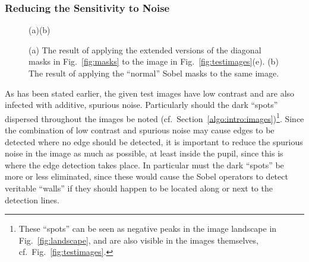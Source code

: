 \subsubsection{Reducing the Sensitivity to Noise}

\begin{figure}[tb]
  \hspace*{0.28\textwidth}(a)\hspace*{0.38\textwidth}(b)
  \caption{\label{fig:mysobel}(a) The result of
  applying the extended versions of the diagonal masks in
  Fig.~\protect\ref{fig:masks} to the image in
  Fig.~\protect\ref{fig:testimages}(e). (b) The result of applying the
  ``normal'' Sobel masks to the same image.}
\end{figure}


As has been stated earlier, the given test images have low contrast
and are also infected with additive, spurious noise.  Particularly
should the dark ``spots'' dispersed throughout the images be noted
(cf.\ Section~\ref{algo:intro:images})\footnote{These ``spots'' can be
  seen as negative peaks in the image landscape in
  Fig.~\ref{fig:landscape}, and are also visible in the images
  themselves, cf.\ Fig.~\ref{fig:testimages}.}.  Since the combination
of low contrast and spurious noise may cause edges to be detected
where no edge should be detected, it is important to reduce the
spurious noise in the image as much as possible, at least inside the
pupil, since this is where the edge detection takes place.
In particular must the dark ``spots'' be more or less eliminated,
since these would cause the Sobel operators to detect veritable
``walls'' if they should happen to be located along or next to the
detection lines.

